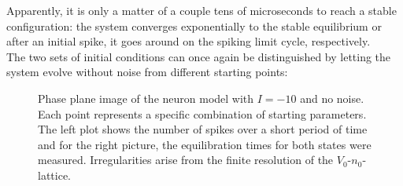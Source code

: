 \documentclass[12pt,a4paper]{article}
\begin{document}
Apparently, it is only a matter of a couple tens of microseconds to reach a stable configuration: the system converges exponentially to the stable equilibrium or after an initial spike, it goes around on the spiking limit cycle, respectively.\\
The two sets of initial conditions can once again be distinguished by letting the system evolve without noise from different starting points:
\begin{figure}[H]
	\hspace*{-0.5cm}
	
	\caption{Phase plane image of the neuron model with $I=-10$ and no noise. Each point represents a specific combination of starting parameters. The left plot shows the number of spikes over a short period of time and for the right picture, the equilibration times for both states were measured. Irregularities arise from the finite resolution of the $V_0$-$n_0$-lattice.}
	\label{twodomrinzel}
\end{figure}
\end{document}

